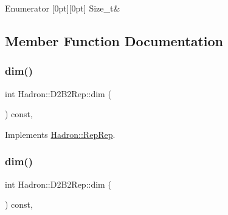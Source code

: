 \begin{DoxyEnumFields}{Enumerator}
[0pt][0pt]{}\mbox{\label{structHadron_1_1D2B2Rep_a009ba10e3e6ec1739d95c83ae3616a07a686ca508d5a011ad0370158b1acb63bb}} 
Size\+\_\+t&\\
\hline

\end{DoxyEnumFields}


\subsection{Member Function Documentation}
\mbox{\label{structHadron_1_1D2B2Rep_a3b51f6989d504745873697ad4dfde43b}} 
\subsubsection{\texorpdfstring{dim()}{dim()}\hspace{0.1cm}{\footnotesize\ttfamily [1/3]}}
{\footnotesize\ttfamily int Hadron\+::\+D2\+B2\+Rep\+::dim (\begin{DoxyParamCaption}{ }\end{DoxyParamCaption}) const\hspace{0.3cm}{\ttfamily [inline]}, {\ttfamily [virtual]}}



Implements \mbox{\hyperlink{structHadron_1_1RepRep_a92c8802e5ed7afd7da43ccfd5b7cd92b}{Hadron\+::\+Rep\+Rep}}.

\mbox{\label{structHadron_1_1D2B2Rep_a3b51f6989d504745873697ad4dfde43b}} 
\subsubsection{\texorpdfstring{dim()}{dim()}\hspace{0.1cm}{\footnotesize\ttfamily [2/3]}}
{\footnotesize\ttfamily int Hadron\+::\+D2\+B2\+Rep\+::dim (\begin{DoxyParamCaption}{ }\end{DoxyParamCaption}) const\hspace{0.3cm}{\ttfamily [inline]}, {\ttfamily [virtual]}}



